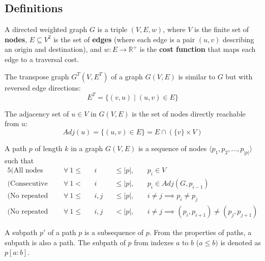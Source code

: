 \subsection{Definitions}
\begin{definition}
    A directed weighted graph $G$ is a triple $(V, E, w)$, where
    $V$ is the finite set of \textbf{nodes}, $E \subseteq V^2$ is the set of \textbf{edges} (where each edge is a pair $(u,v)$ describing an origin and destination), and $w: E \rightarrow \mathbb{R}^+$ is the \textbf{cost function} that maps each edge to a traversal cost.
\end{definition}
\begin{definition}
    The transpose graph $G^T(V, E^T)$ of a graph $G(V, E)$ is similar to $G$ but with reversed edge directions:
    \begin{equation*}
        E^T = \{(v,u) \mid (u,v) \in E\}
    \end{equation*}
\end{definition}
\begin{definition}
    The adjacency set of $u \in V$ in $G(V,E)$ is the set of nodes directly reachable from $u$:
    \begin{equation*}
        Adj(u) = \{(u, v) \in E\} = E \cap (\{v\}\times V)
    \end{equation*}
\end{definition}
\begin{definition}[Path]
    A path $p$ of length $k$ in a graph $G(V,E)$ is a sequence of nodes $\langle p_1,p_2,...,p_{|p|}\rangle$ such that
    \begin{alignat*}{5}
        \text{(All nodes belong to the graph)}       ~~&\forall~1 \leq &&i   &&\leq |p|,&&~p_i \in V \\
        \text{(Consecutive nodes are adjacent)}      ~~&\forall~1 <    &&i   &&\leq |p|,&&~p_i \in Adj(G, p_{i-1})\\
        \text{(No repeated nodes)}                   ~~&\forall~1 \leq &&i,j &&\leq |p|,&&~i\neq j \implies p_i \neq p_j \\
        \text{(No repeated edges)}                   ~~&\forall~1 \leq &&i,j &&<    |p|,&&~i\neq j \implies (p_i,p_{i+1}) \neq (p_j, p_{j+1})
    \end{alignat*}
\end{definition}
\begin{definition}[Subpath]
    A subpath $p'$ of a path $p$ is a subsequence of $p$. From the properties of paths, a subpath is also a path. The subpath of $p$ from indexes $a$ to $b$ ($a \leq b)$ is denoted as $p[a:b]$.
\end{definition}
